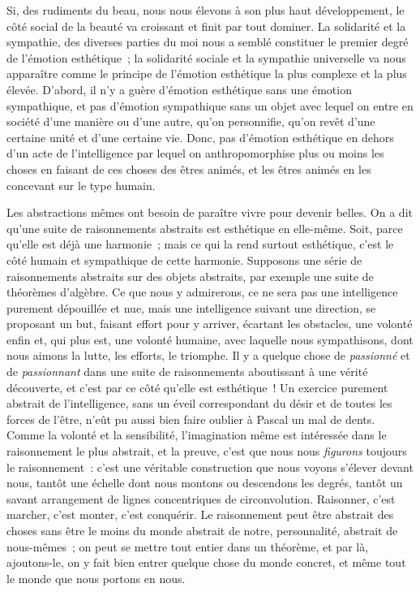 \documentclass[french,twoside]{book} %
\begin{document}
Si, des rudiments du beau, nous nous élevons à son plus haut développement, le côté social de la beauté va croissant et finit par tout dominer. La solidarité et la sympathie, des diverses parties du moi nous a semblé constituer le premier degré de l’émotion esthétique ; la solidarité sociale et la sympathie universelle va nous apparaître comme le principe de l’émotion esthétique la plus complexe et la plus élevée. D’abord, il n’y a guère d’émotion esthétique sans une émotion sympathique, et pas d’émotion sympathique sans un objet avec lequel on entre en société d’une manière ou d’une autre, qu’on personnifie, qu’on revêt d’une certaine unité et d’une certaine vie. Donc, pas d’émotion esthétique en dehors d’un acte de l’intelligence par lequel on anthropomorphise plus ou moins les choses en faisant de ces choses des êtres animés, et les êtres animés en les concevant sur le type humain.\par
Les abstractions mêmes ont besoin de paraître vivre pour devenir belles. On a dit qu’une suite de raisonnements abstraits est esthétique en elle-même. Soit, parce qu’elle est déjà une harmonie ; mais ce qui la rend surtout esthétique, c’est le côté humain et sympathique de cette harmonie. Supposons une série de raisonnements abstraits sur des objets abstraits, par exemple une suite de théorèmes d’algèbre. Ce que nous y admirerons, ce ne sera pas une intelligence purement dépouillée et nue, mais une intelligence suivant une direction, se proposant un but, faisant effort pour y arriver, écartant les obstacles, une volonté enfin et, qui plus est, une volonté humaine, avec laquelle nous sympathisons, dont nous aimons la lutte, les efforts, le triomphe. Il y a quelque chose de \emph{passionné} et de \emph{passionnant} dans une suite de raisonnements aboutissant à une vérité découverte, et c’est par ce côté qu’elle est esthétique ! Un exercice purement abstrait de l’intelligence, sans un éveil correspondant du désir et de toutes les forces de l’être, n’eût pu aussi bien faire oublier à Pascal un mal de dents. Comme la volonté et la sensibilité, l’imagination même est intéressée dans le raisonnement le plus abstrait, et la preuve, c’est que nous nous \emph{figurons} toujours le raisonnement : c’est une véritable construction que nous voyons s’élever devant nous, tantôt une échelle dont nous montons ou descendons les degrés, tantôt un savant arrangement de lignes concentriques de circonvolution. Raisonner, c’est marcher, c’est monter, c’est conquérir. Le raisonnement peut être abstrait des choses sans être le moins du monde abstrait de notre, personnalité, abstrait de nous-mêmes ; on peut se mettre tout entier dans un théorème, et par là, ajoutons-le, on y fait bien entrer quelque chose du monde concret, et même tout le monde que nous portons en nous.\par
\end{document}
